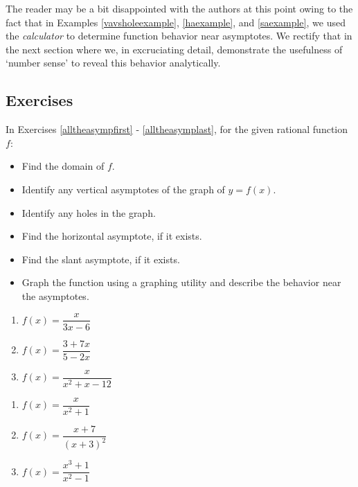The reader may be a bit disappointed with the authors at this point owing to the fact that in Examples \ref{vavsholeexample}, \ref{haexample}, and \ref{saexample}, we used the \textit{calculator} to determine function behavior near asymptotes.  We rectify that in the next section where we, in excruciating detail, demonstrate the usefulness of `number sense' to reveal this behavior analytically.  
\newpage

\subsection{Exercises}

In Exercises \ref{alltheasympfirst} - \ref{alltheasymplast}, for the given rational function $f$:

\begin{itemize}

\item Find the domain of $f$.
\item Identify any vertical asymptotes of the graph of $y = f(x)$.
\item Identify any holes in the graph.
\item Find the horizontal asymptote, if it exists.
\item Find the slant asymptote, if it exists.
\item Graph the function using a graphing utility and describe the behavior near the asymptotes.

\end{itemize}

\begin{multicols}{3}
\begin{enumerate}

\item $f(x) = \dfrac{x}{3x - 6}$ \label{alltheasympfirst}
\item $f(x) = \dfrac{3 + 7x}{5 - 2x}$
\item $f(x) = \dfrac{x}{x^{2} + x - 12}$

\setcounter{HW}{\value{enumi}}
\end{enumerate}
\end{multicols}

\begin{multicols}{3}
\begin{enumerate}
\setcounter{enumi}{\value{HW}}

\item $f(x) = \dfrac{x}{x^{2} + 1}$
\item $f(x) = \dfrac{x + 7}{(x + 3)^{2}}$
\item $f(x) = \dfrac{x^{3} + 1}{x^{2} - 1}$

\setcounter{HW}{\value{enumi}}
\end{enumerate}
\end{multicols}

